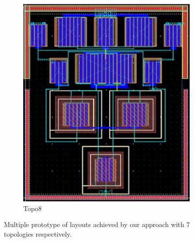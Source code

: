 \begin{figure}[ht]
\begin{subfigure}[t]{0.2\textwidth}
        \includegraphics[width=\textwidth]{Fig/MultTopo_Topo8.eps}
        \caption{Topo8}\label{fig:Topo8}
        \end{subfigure}
        \caption{Multiple prototype of layouts achieved by our approach with 7 topologies respectively.}
        \label{fig:MultTopo}
      \end{figure}

